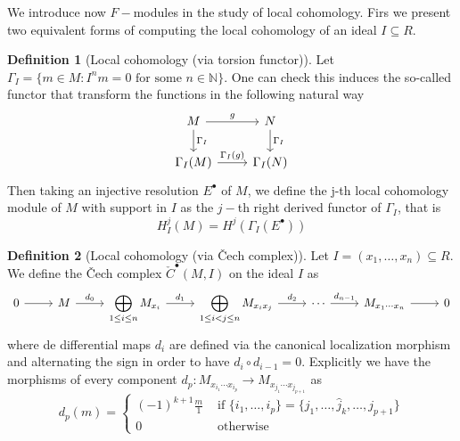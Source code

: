 \documentclass[leqno]{article}
\theoremstyle{definition}
\newtheorem{definition}{Definition}[section]
\begin{document}
We introduce now  $F-$modules in the study of local cohomology. Firs we present two equivalent forms of computing the local cohomology of an ideal  $I\subseteq R$.

\begin{definition}[Local cohomology (via torsion functor)] Let $\Gamma_I= \{m\in M : I^nm = 0 \text{ for some }n\in \mathbb{N} \}$. One can check this induces the so-called functor that transform the functions in the following natural way
\[\begin{tikzcd}
	M & N \\
	{\Gamma_I(M)} & {\Gamma_I(N)}
	\arrow["{\Gamma_I}", from=1-1, to=2-1]
	\arrow["{\Gamma_I}", from=1-2, to=2-2]
	\arrow["g", from=1-1, to=1-2]
	\arrow["{\Gamma_I(g)}", from=2-1, to=2-2]
\end{tikzcd}\]
Then taking an injective resolution $E^\bullet$ of $M$, we define the j-th local cohomology module of $M$ with support in  $I$ as the  $j-$th right derived functor of $\Gamma_I $, that is
\[
H_I^j(M)=H^j(\Gamma _I (E^\bullet) )
\] 
\end{definition}

\begin{definition}[Local cohomology (via \v{C}ech complex)] Let $I=(x_1, \ldots, x_n)\subseteq R$. We define the \v{C}ech complex $\check{C}^{\bullet}(M, I)$ on the ideal $I$ as
\[\begin{tikzcd}
	0 & M & {\displaystyle{\bigoplus_{1\le i\le n} M_{x_i}}} & {\displaystyle{\bigoplus_{1\le i<j\le n} M_{x_ix_j}}} & \cdots & {M_{x_1\cdots x_n}} & 0
	\arrow[from=1-1, to=1-2]
	\arrow["{d_0}", from=1-2, to=1-3]
	\arrow["{d_1}", from=1-3, to=1-4]
	\arrow["{d_2}", from=1-4, to=1-5]
	\arrow["{d_{n-1}}", from=1-5, to=1-6]
	\arrow[from=1-6, to=1-7]
\end{tikzcd}\]
where de differential maps $d_i$ are defined via the canonical localization morphism and alternating the sign in order to have $d_i\circ d_{i-1}=0$. Explicitly we have the morphisms of every component $d_p: M_{x_{i_1}\cdots x_{i_p}} \to M_{x_{j_1}\cdots x_{j_{p+1}}}$ as
\[
  d_p(m) = \begin{cases}
	(-1)^{k+1} \frac{m}{1} &\text{ if } \{i_1, \ldots, i_p\} = \{j_1, \ldots, \hat{j}_k,\ldots, j_{p+1}\}\\ 0 &\text{ otherwise}
  \end{cases}
\] 
\end{definition}
\end{document}
